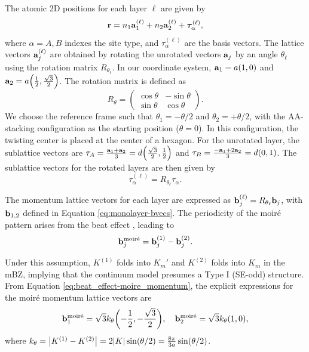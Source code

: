 The atomic 2D positions for each layer $\ell$ are given by
\begin{equation} \label{eq:position-atoms-tbg}
{\vb{r}} = n_1 {\vb{a}}_{1}^{(\ell)} + n_2 {\vb{a}}_{2}^{(\ell)} + {\bm{\tau}}_{\alpha}^{(\ell)},
\end{equation}
where $\alpha = A, B$ indexes the site type, and $\tau_{\alpha}^{(\ell)}$ are the basis vectors. The lattice vectors ${\vb{a}}_{j}^{(\ell)}$ are obtained by rotating the unrotated vectors ${\vb{a}}_j$ by an angle $\theta_\ell$ using the rotation matrix $R_{\theta_\ell}$. In our coordinate system, ${\vb{a}}_1 = a(1,0)$ and ${\vb{a}}_2 = a\qty(\frac{1}{2}, \frac{\sqrt{3}}{2})$. The rotation matrix is defined as
\begin{equation} \label{eq:rotation-matrix}
R_\theta =
\begin{pmatrix}
\cos\theta & -\sin\theta \\
\sin\theta & \cos\theta
\end{pmatrix}.
\end{equation}
We choose the reference frame such that $\theta_1 = -\theta/2$ and $\theta_2 = +\theta/2$, with the AA-stacking configuration as the starting position ($\theta=0$). In this configuration, the twisting center is placed at the center of a hexagon. For the unrotated layer, the sublattice vectors are $\tau_A = \frac{{\vb{a}}_1 + {\vb{a}}_2}{3} = d\qty(\frac{\sqrt{3}}{2}, \frac{1}{2})$ and $\tau_B = \frac{-{\vb{a}}_1 + 2{\vb{a}}_2}{3} = d(0,1)$. The sublattice vectors for the rotated layers are then given by
\begin{equation} \label{eq:tau_tbg_lattice_AB}
\tau_{\alpha}^{(\ell)} = R_{\theta_\ell} \tau_\alpha.
\end{equation}

The momentum lattice vectors for each layer are expressed as ${\vb{b}}_j^{(\ell)} = R_{\theta_\ell} {\vb{b}}_j$, with ${\vb{b}}_{1,2}$ defined in Equation \ref{eq:monolayer-bvecs}. The periodicity of the moiré pattern arises from the beat effect \cite{handbook2019}, leading to
\begin{equation} \label{eq:beat_effect-moire_momentum}
{\vb{b}}_j^{\text{moiré}} = {\vb{b}}_{j}^{(1)} - {\vb{b}}_{j}^{(2)}.
\end{equation}

Under this assumption, $K^{(1)}$ folds into $K_m'$ and $K^{(2)}$ folds into $K_m$ in the mBZ, implying that the continuum model presumes a Type I (SE-odd) structure. From Equation \ref{eq:beat_effect-moire_momentum}, the explicit expressions for the moiré momentum lattice vectors are
\begin{equation} \label{eq:moire-bvecs}
\vb{b}_1^{\text{moiré}} = \sqrt{3} k_\theta \qty(-\frac{1}{2}, -\frac{\sqrt{3}}{2}), \quad
\vb{b}_2^{\text{moiré}} = \sqrt{3} k_\theta \qty(1, 0),
\end{equation}
where $k_\theta = \abs{K^{(1)}-K^{(2)}} = 2 \abs{K} \sin(\theta/2) = \frac{8\pi}{3a} \sin(\theta/2)$.

